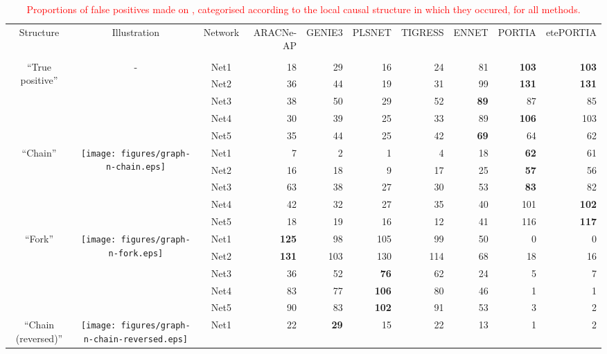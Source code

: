 \begin{table*}[t]
\caption{\textcolor{red}{Proportions of false positives made on \dreamfour, categorised according to the local causal structure in which they occured, for all methods.}\label{tab:fp-categories-dream4}}\begin{adjustbox}{max width=\textwidth}\color{red}\begin{tabular}{cccrrrrrrr} \\ \toprule
Structure & Illustration & Network & ARACNe-AP & GENIE3 & PLSNET & TIGRESS & ENNET & PORTIA & etePORTIA \\
          
 &  &  &  &  &  &  &  &  &  \\ \midrule
\multirow{5}{*}{``True positive''} & \multirow{5}{*}{-} & Net1 & 18 & 29 & 16 & 24 & 81 & \textbf{103} & \textbf{103} \\
  &   & Net2 & 36 & 44 & 19 & 31 & 99 & \textbf{131} & \textbf{131} \\
  &   & Net3 & 38 & 50 & 29 & 52 & \textbf{89} & 87 & 85 \\
  &   & Net4 & 30 & 39 & 25 & 33 & 89 & \textbf{106} & 103 \\
  &   & Net5 & 35 & 44 & 25 & 42 & \textbf{69} & 64 & 62 \\
\midrule
\multirow{5}{*}{``Chain''} & \multirow{5}{*}{\texttt{[image: figures/graph-n-chain.eps]}} & Net1 & 7 & 2 & 1 & 4 & 18 & \textbf{62} & 61 \\
  &   & Net2 & 16 & 18 & 9 & 17 & 25 & \textbf{57} & 56 \\
  &   & Net3 & 63 & 38 & 27 & 30 & 53 & \textbf{83} & 82 \\
  &   & Net4 & 42 & 32 & 27 & 35 & 40 & 101 & \textbf{102} \\
  &   & Net5 & 18 & 19 & 16 & 12 & 41 & 116 & \textbf{117} \\
\midrule
\multirow{5}{*}{``Fork''} & \multirow{5}{*}{\texttt{[image: figures/graph-n-fork.eps]}} & Net1 & \textbf{125} & 98 & 105 & 99 & 50 & 0 & 0 \\
  &   & Net2 & \textbf{131} & 103 & 130 & 114 & 68 & 18 & 16 \\
  &   & Net3 & 36 & 52 & \textbf{76} & 62 & 24 & 5 & 7 \\
  &   & Net4 & 83 & 77 & \textbf{106} & 80 & 46 & 1 & 1 \\
  &   & Net5 & 90 & 83 & \textbf{102} & 91 & 53 & 3 & 2 \\
\midrule
\multirow{5}{*}{``Chain (reversed)''} & \multirow{5}{*}{\texttt{[image: figures/graph-n-chain-reversed.eps]}} & Net1 & 22 & \textbf{29} & 15 & 22 & 13 & 1 & 2 \\

\end{tabular}
\end{adjustbox}
\end{table*}

